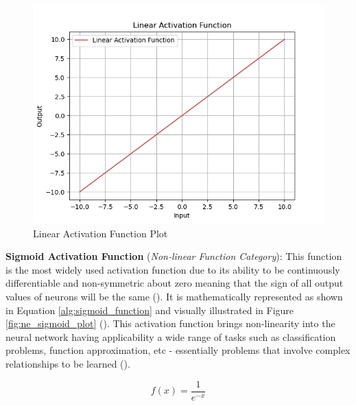 \parbreak
\begin{figure}[H] %
    \centering %
     \includegraphics[width=\textwidth]{Figures/chapter_ne/ne_linear_plot.png} %
    \caption{Linear Activation Function Plot}
    \label{fig:ne_linear_plot} %
\end{figure}

\parbreak\noindent \textbf{Sigmoid Activation Function} (\textit{Non-linear Function Category}): This function is the most widely used activation function due to its ability to be continuously differentiable and non-symmetric about zero meaning that the sign of all output values of neurons will be the same (\cite{sharma2017activation}). It is mathematically represented as shown in Equation \ref{alg:sigmoid_function} and visually illustrated in Figure \ref{fig:ne_sigmoid_plot} (\cite{sharma2017activation}). This activation function brings non-linearity into the neural network having applicability a wide range of tasks such as classification problems, function approximation, etc - essentially problems that involve complex relationships to be learned (\cite{sharma2017activation}).
    
\begin{ceqn}
    \begin{equation}\label{alg:sigmoid_function}
        f(x) = \frac{1}{e^{-x}}
    \end{equation}
\end{ceqn}


